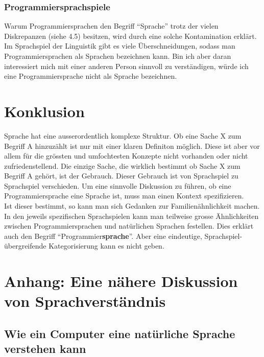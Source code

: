 \documentclass[10pt,a4paper]{article}
\begin{document}
\subsubsection{Programmiersprachspiele}
Warum Programmiersprachen den Begriff \enquote{Sprache} trotz der vielen Diskrepanzen (siehe 4.5) besitzen, wird durch eine solche Kontamination erklärt. Im Sprachspiel der Linguistik gibt es viele Überschneidungen, sodass man Programmiersprachen als Sprachen bezeichnen kann. Bin ich aber daran interessiert mich mit einer anderen Person sinnvoll zu verständigen, würde ich eine Programmiersprache nicht als Sprache bezeichnen.


\section{Konklusion}
Sprache hat eine ausserordentlich komplexe Struktur. Ob eine Sache X zum Begriff A hinzuzählt ist nur mit einer klaren Definiton möglich. Diese ist aber vor allem für die grössten und umfochtesten Konzepte nicht vorhanden oder nicht zufriedenstellend.
Die einzige Sache, die wirklich bestimmt ob Sache X zum Begriff A gehört, ist der Gebrauch.
Dieser Gebrauch ist von Sprachspiel zu Sprachspiel verschieden.
Um eine sinnvolle Diskussion zu führen, ob eine Programmiersprache eine Sprache ist, muss man einen Kontext spezifizieren. \\
Ist dieser bestimmt, so kann man sich Gedanken zur Familienähnlichkeit machen.
In den jeweils spezifischen Sprachspielen kann man teilweise grosse Ähnlichkeiten zwischen Programmiersprachen und natürlichen Sprachen festellen. Dies erklärt auch den Begriff \enquote{Programmier\textbf{sprache}}. Aber eine eindeutige, Sprachspiel-übergreifende Kategorisierung kann es nicht geben.

\newpage
\renewcommand\thesection{\roman{section}}
\setcounter{section}{0}


\section{Anhang: Eine nähere Diskussion von Sprachverständnis}

\subsection{Wie ein Computer eine natürliche Sprache verstehen kann}
\end{document}

